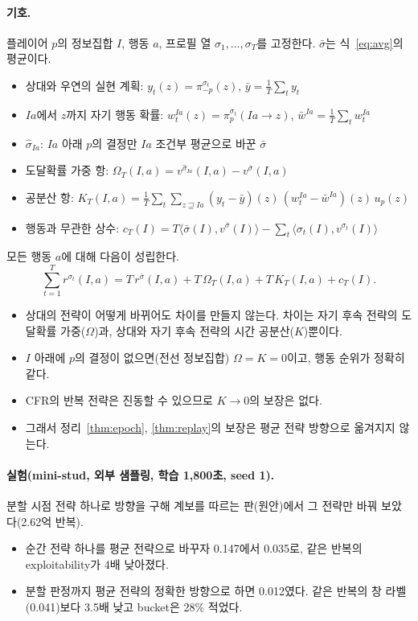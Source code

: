 \paragraph{기호.}
플레이어 $p$의 정보집합 $I$, 행동 $a$, 프로필 열 $\sigma_1,\dots,\sigma_T$를 고정한다. $\bar\sigma$는 식~\eqref{eq:avg}의 평균이다.
\begin{itemize}
  \item 상대와 우연의 실현 계획: $y_t(z)=\pi^{\sigma_t}_{-p}(z)$, $\bar y=\frac1T\sum_ty_t$
  \item $Ia$에서 $z$까지 자기 행동 확률: $w_t^{Ia}(z)=\pi_p^{\sigma_t}(Ia\to z)$, $\bar w^{Ia}=\frac1T\sum_tw_t^{Ia}$
  \item $\hat\sigma_{Ia}$: $Ia$ 아래 $p$의 결정만 $Ia$ 조건부 평균으로 바꾼 $\bar\sigma$
  \item 도달확률 가중 항: $\Omega_T(I,a)=v^{\hat\sigma_{Ia}}(I,a)-v^{\bar\sigma}(I,a)$
  \item 공분산 항: $K_T(I,a)=\frac1T\sum_t\sum_{z\sqsupseteq Ia}(y_t-\bar y)(z)\,(w_t^{Ia}-\bar w^{Ia})(z)\,u_p(z)$
  \item 행동과 무관한 상수: $c_T(I)=T\langle\bar\sigma(I),v^{\bar\sigma}(I)\rangle-\sum_t\langle\sigma_t(I),v^{\sigma_t}(I)\rangle$
\end{itemize}
\begin{theorem}[평균 전략 방향의 분해]\label{thm:avgdir}
모든 행동 $a$에 대해 다음이 성립한다.
\[
\sum_{t=1}^Tr^{\sigma_t}(I,a)=T\,r^{\bar\sigma}(I,a)+T\,\Omega_T(I,a)+T\,K_T(I,a)+c_T(I).
\]
\end{theorem}
\begin{itemize}
  \item 상대의 전략이 어떻게 바뀌어도 차이를 만들지 않는다. 차이는 자기 후속 전략의 도달확률 가중($\Omega$)과, 상대와 자기 후속 전략의 시간 공분산($K$)뿐이다.
  \item $I$ 아래에 $p$의 결정이 없으면(전선 정보집합) $\Omega=K=0$이고, 행동 순위가 정확히 같다.
  \item CFR의 반복 전략은 진동할 수 있으므로 $K\to0$의 보장은 없다.
  \item 그래서 정리~\ref{thm:epoch}, \ref{thm:replay}의 보장은 평균 전략 방향으로 옮겨지지 않는다.
\end{itemize}
\paragraph{실험(mini-stud, 외부 샘플링, 학습 1,800초, seed 1).}
분할 시점 전략 하나로 방향을 구해 계보를 따르는 판(원안)에서 그 전략만 바꿔 보았다(2.62억 반복).
\begin{itemize}
  \item 순간 전략 하나를 평균 전략으로 바꾸자 0.147에서 0.035로, 같은 반복의 exploitability가 4배 낮아졌다.
  \item 분할 판정까지 평균 전략의 정확한 방향으로 하면 0.012였다. 같은 반복의 창 라벨(0.041)보다 3.5배 낮고 bucket은 28\% 적었다.
\end{itemize}

